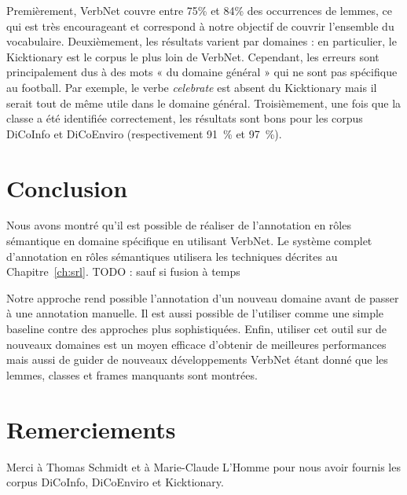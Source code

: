 Premièrement, VerbNet couvre entre 75\% et 84\% des occurrences de lemmes, ce
qui est très encourageant et correspond à notre objectif de couvrir l'ensemble
du vocabulaire.
Deuxièmement, les résultats varient par domaines : en particulier, le
Kicktionary est le corpus le plus loin de VerbNet. Cependant, les erreurs sont
principalement dus à des mots « du domaine général » qui ne sont pas spécifique
au football. Par exemple, le verbe \emph{celebrate} est absent du Kicktionary
mais il serait tout de même utile dans le domaine général.
Troisièmement, une fois que la classe a été identifiée correctement, les
résultats sont bons pour les corpus DiCoInfo et DiCoEnviro (respectivement
91~\% et 97~\%).

\section{Conclusion}

Nous avons montré qu'il est possible de réaliser de l'annotation en rôles
sémantique en domaine spécifique en utilisant VerbNet. Le système complet
d'annotation en rôles sémantiques utilisera les techniques décrites au
Chapitre~\ref{ch:srl}. TODO : sauf si fusion à temps

Notre approche rend possible l'annotation d'un nouveau domaine avant de passer
à une annotation manuelle. Il est aussi possible de l'utiliser comme une simple
baseline contre des approches plus sophistiquées. Enfin, utiliser cet outil sur
de nouveaux domaines est un moyen efficace d'obtenir de meilleures performances
mais aussi de guider de nouveaux développements VerbNet étant donné que les
lemmes, classes et frames manquants sont montrées.

\section*{Remerciements}

Merci à Thomas Schmidt et à Marie-Claude L'Homme pour nous avoir fournis les
corpus DiCoInfo, DiCoEnviro et Kicktionary.
